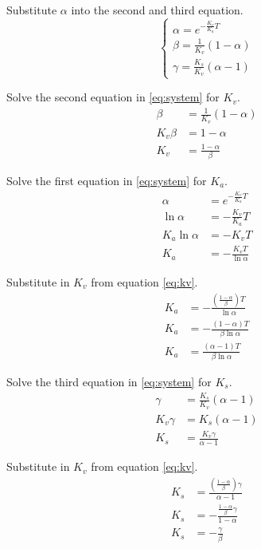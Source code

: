 \documentclass[10pt,conference,compsoc]{IEEEtran}
\begin{document}
Substitute $\alpha$ into the second and third equation.
\begin{equation}
  \begin{cases}
    \alpha = e^{-\frac{K_v}{K_a} T} \\
    \beta = \frac{1}{K_v}(1 - \alpha) \\
    \gamma = \frac{K_s}{K_v}(\alpha - 1)
  \end{cases} \label{eq:system}
\end{equation}

Solve the second equation in \eqref{eq:system} for $K_v$.
\begin{align}
  \beta &= \frac{1}{K_v}(1 - \alpha) \nonumber \\
  K_v \beta &= 1 - \alpha \nonumber \\
  K_v &= \frac{1 - \alpha}{\beta} \label{eq:kv}
\end{align}

Solve the first equation in \eqref{eq:system} for $K_a$.
\begin{align*}
  \alpha &= e^{-\frac{K_v}{K_a} T} \\
  \ln\alpha &= -\frac{K_v}{K_a} T \\
  K_a \ln\alpha &= -K_v T \\
  K_a &= -\frac{K_v T}{\ln\alpha}
\end{align*}

Substitute in $K_v$ from equation \eqref{eq:kv}.
\begin{align}
  K_a &= -\frac{\left(\frac{1 - \alpha}{\beta}\right) T}{\ln\alpha} \nonumber \\
  K_a &= -\frac{(1 - \alpha) T}{\beta \ln\alpha} \nonumber \\
  K_a &= \frac{(\alpha - 1) T}{\beta \ln\alpha}
\end{align}

Solve the third equation in \eqref{eq:system} for $K_s$.
\begin{align*}
  \gamma &= \frac{K_s}{K_v}(\alpha - 1) \\
  K_v \gamma &= K_s(\alpha - 1) \\
  K_s &= \frac{K_v \gamma}{\alpha - 1}
\end{align*}

Substitute in $K_v$ from equation \eqref{eq:kv}.
\begin{align}
  K_s &= \frac{\left(\frac{1 - \alpha}{\beta}\right) \gamma}{\alpha - 1}
    \nonumber \\
  K_s &= -\frac{\frac{1 - \alpha}{\beta} \gamma}{1 - \alpha}
    \nonumber \\
  K_s &= -\frac{\gamma}{\beta}
\end{align}
\end{document}
